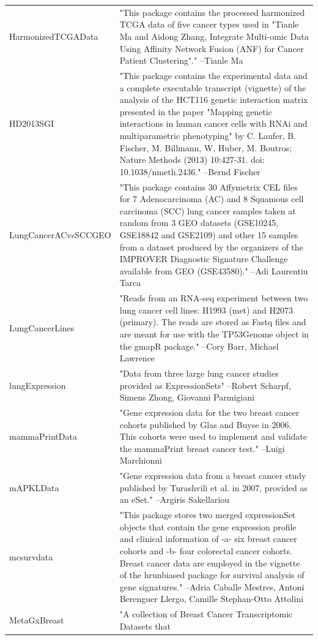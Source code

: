 \begin{longtable}[t]{l>{\raggedright\arraybackslash}p{25em}}
\addlinespace
HarmonizedTCGAData & "This package contains the processed harmonized TCGA data
of five cancer types used in "Tianle Ma and Aidong Zhang,
Integrate Multi-omic Data Using Affinity Network Fusion (ANF)
for Cancer Patient Clustering"." --Tianle Ma\\
HD2013SGI & "This package contains the experimental data and a complete
executable transcript (vignette) of the analysis of the HCT116
genetic interaction matrix presented in the paper "Mapping
genetic interactions in human cancer cells with RNAi and
multiparametric phenotyping" by C. Laufer, B. Fischer, M.
Billmann, W. Huber, M. Boutros; Nature Methods (2013)
10:427-31. doi: 10.1038/nmeth.2436." --Bernd Fischer\\
LungCancerACvsSCCGEO & "This package contains 30 Affymetrix CEL files for 7
Adenocarcinoma (AC) and 8 Squamous cell carcinoma (SCC) lung
cancer samples taken at random from 3 GEO datasets (GSE10245,
GSE18842 and GSE2109) and other 15 samples from a dataset
produced by the organizers of the IMPROVER Diagnostic Signature
Challenge available from GEO (GSE43580)." --Adi Laurentiu Tarca\\
LungCancerLines & "Reads from an RNA-seq experiment between two lung cancer
cell lines: H1993 (met) and H2073 (primary). The reads are
stored as Fastq files and are meant for use with the TP53Genome
object in the gmapR package." --Cory Barr, Michael Lawrence\\
lungExpression & "Data from three large lung cancer studies provided as
ExpressionSets" --Robert Scharpf, Simens Zhong, Giovanni Parmigiani\\
\addlinespace
mammaPrintData & "Gene expression data for the two breast cancer cohorts
published by Glas and Buyse in 2006. This cohorts were used to
implement and validate the mammaPrint breast cancer test." --Luigi Marchionni\\
mAPKLData & "Gene expression data from a breast cancer study published
by Turashvili et al. in 2007, provided as an eSet." --Argiris Sakellariou\\
mcsurvdata & "This package stores two merged expressionSet objects that
contain the gene expression profile and clinical information of
-a- six breast cancer cohorts and -b- four colorectal cancer
cohorts. Breast cancer data are employed in the vignette of the
hrunbiased package for survival analysis of gene signatures." --Adria Caballe Mestres, Antoni Berenguer Llergo, Camille Stephan-Otto Attolini\\
MetaGxBreast & "A collection of Breast Cancer Transcriptomic Datasets that

\end{longtable}
